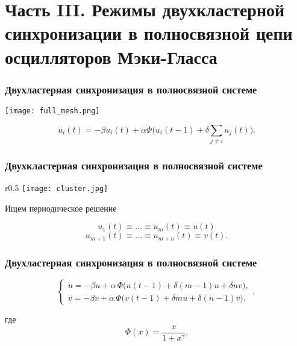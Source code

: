 \section{Часть III. Режимы двухкластерной синхронизации в полносвязной цепи осцилляторов Мэки-Гласса}

\begin{frame}
	\frametitle{Двухластерная синхронизация в полносвязной системе}
	
	\begin{center}
		\texttt{[image: full\_mesh.png]}
	\end{center}
	
	\vspace{20px}
	
	$$\dot{u}_i(t) = -\beta u_i(t) + \alpha \Phi\big(u_i(t - 1) + \delta\sum\limits_{j \neq i} u_j(t)\big).$$
\end{frame}

\begin{frame}
	\frametitle{Двухкластерная синхронизация в полносвязной системе}
	
	\begin{wrapfigure}{r}{0.5\textwidth}
		\texttt{[image: cluster.jpg]}
	\end{wrapfigure}
	
	Ищем периодическое решение
	
	$$u_1(t) \equiv \dots \equiv u_m(t) \equiv u(t)$$
	$$u_{m + 1}(t) \equiv \dots \equiv u_{m + n}(t) \equiv v(t).$$
	
\end{frame}

\begin{frame}
	\frametitle{Двухластерная синхронизация в полносвязной системе}
	
	\begin{equation*}
		\begin{cases}
			\dot{u} = -\beta u + \alpha \, \Phi \big(u(t - 1) + \delta (m - 1) u + \delta n v\big),\\
			\dot{v} = -\beta v + \alpha  \, \Phi \big(v(t - 1) + \delta m u + \delta (n - 1) v\big).
		\end{cases},
	\end{equation*}
	
	где 
	\begin{equation*}
		\Phi(x) = \dfrac{x}{1 + x^\gamma}.
	\end{equation*}
\end{frame}

